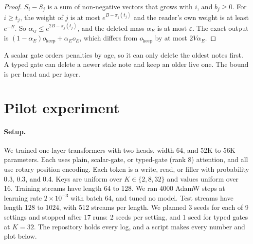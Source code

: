 \documentclass[10pt]{article}
\theoremstyle{definition}
\theoremstyle{remark}
\begin{document}
\begin{proof}
$S_i - S_j$ is a sum of non-negative vectors that grows with $i$, and $b_j \ge 0$. For $i \ge t_j$, the weight of $j$ is at most $e^{B - \pi_j(t_j)}$ and the reader's own weight is at least $e^{-B}$. So $\alpha_{ij} \le e^{2B - \pi_j(t_j)}$, and the deleted mass $\alpha_E$ is at most $\varepsilon$. The exact output is $(1 - \alpha_E) o_{\mathrm{keep}} + \alpha_E o_E$, which differs from $o_{\mathrm{keep}}$ by at most $2V\alpha_E$.
\end{proof}

A scalar gate orders penalties by age, so it can only delete the oldest notes first. A typed gate can delete a newer stale note and keep an older live one. The bound is per head and per layer.

\section{Pilot experiment}\label{sec:exp}

\paragraph{Setup.} We trained one-layer transformers with two heads, width 64, and 52K to 56K parameters. Each uses plain, scalar-gate, or typed-gate (rank 8) attention, and all use rotary position encoding. Each token is a write, read, or filler with probability 0.3, 0.3, and 0.4. Keys are uniform over $K \in \{2, 8, 32\}$ and values uniform over 16. Training streams have length 64 to 128. We ran 4000 AdamW steps at learning rate $2\times10^{-3}$ with batch 64, and tuned no model. Test streams have length 128 to 1024, with 512 streams per length. We planned 3 seeds for each of 9 settings and stopped after 17 runs: 2 seeds per setting, and 1 seed for typed gates at $K = 32$. The repository holds every log, and a script makes every number and plot below.

\begin{table}[t]
\centering\small

\caption{Read accuracy by test length $T$. Training streams were at most 128 tokens. Mean over seeds, with (min, max) in brackets.}
\label{tab:acc}
\end{table}
\end{document}
